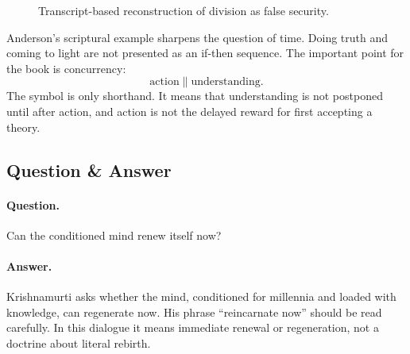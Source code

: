 \documentclass[11pt,oneside]{book}
\begin{document}
\begin{figure}
\centering
{}

Transcript-based reconstruction of division as false security.
\end{figure}

Anderson's scriptural example sharpens the question of time. Doing truth and coming to light are not presented as an if-then sequence. The important point for the book is concurrency:
\begin{equation}
\text{action}
\parallel
\text{understanding}.
\end{equation}
The symbol is only shorthand. It means that understanding is not postponed until after action, and action is not the delayed reward for first accepting a theory.

\subsection{Question \& Answer}

\paragraph{Question.}
Can the conditioned mind renew itself now?

\paragraph{Answer.}
Krishnamurti asks whether the mind, conditioned for millennia and loaded with knowledge, can regenerate now. His phrase ``reincarnate now'' should be read carefully. In this dialogue it means immediate renewal or regeneration, not a doctrine about literal rebirth.
\end{document}
